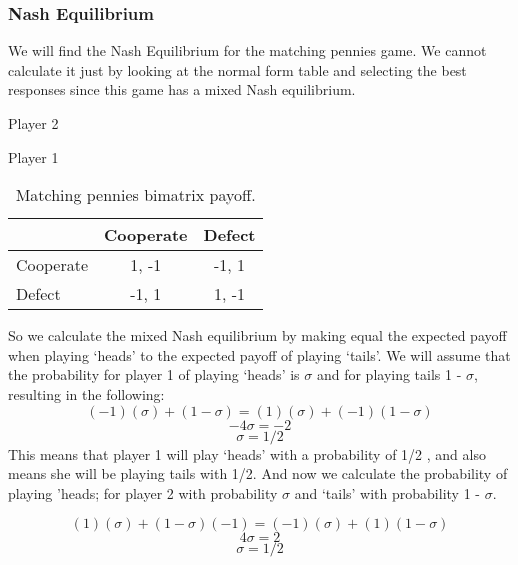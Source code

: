\documentclass{book}
\begin{document}
\subsubsection{Nash Equilibrium}
We will find the Nash Equilibrium for the matching pennies game. We cannot calculate it just by looking at the normal form table and selecting the best responses since this game has a mixed Nash equilibrium.

\begin{table}[H]
\begin{center}
Player 2

Player 1
\begin{tabular}{|l|c|c|}
\hline
 & Cooperate & Defect\\ 
\hline
Cooperate & 1, -1 & -1, 1\\
\hline
Defect & -1, 1 & 1, -1\\
\hline
\end{tabular}

\caption{ Matching pennies bimatrix payoff.}
\label{fig:mpnashmx}	
\end{center}
\end{table}

So we calculate the mixed Nash equilibrium by making equal the expected payoff  when playing `heads' to the expected payoff of playing `tails'. We will assume that the probability for player 1 of playing `heads' is $\sigma$ and for playing tails 1 - $\sigma$, resulting in the following:
\begin{equation}
(-1)(\sigma) + (1 - \sigma) = (1)(\sigma) + (-1)(1 - \sigma)
\end{equation}
\begin{equation}
-4 \sigma = -2
\end{equation}
\begin{equation}
\sigma = 1/2
\end{equation}
This means that player 1 will play `heads' with a probability of 1/2 , and also means she will be playing tails with 1/2. And now we calculate the probability of playing 'heads; for player 2 with probability $\sigma$ and `tails' with probability 1 - $\sigma$.

\begin{equation}
(1)(\sigma) + (1 - \sigma)(-1) = (-1)(\sigma) + (1)(1 - \sigma)
\end{equation}
\begin{equation}
4 \sigma = 2
\end{equation}
\begin{equation}
\sigma = 1/2
\end{equation}
\end{document}
